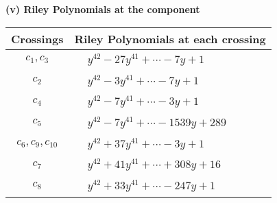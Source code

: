\documentclass[1p]{elsarticle_modified}
\theoremstyle{definition}
\begin{document}
\newpage\renewcommand{\arraystretch}{1}
\flushleft \textbf{(v) Riley Polynomials at the component}\newline \\
\begin{tabular}{m{50pt}|m{274pt}}
Crossings & \hspace{64pt}Riley Polynomials at each crossing \\
\hline $$\begin{aligned}c_{1},c_{3}\end{aligned}$$&$\begin{aligned}
&y^{42}-27 y^{41}+\cdots-7 y+1
\end{aligned}$\\
\hline $$\begin{aligned}c_{2}\end{aligned}$$&$\begin{aligned}
&y^{42}-3 y^{41}+\cdots-7 y+1
\end{aligned}$\\
\hline $$\begin{aligned}c_{4}\end{aligned}$$&$\begin{aligned}
&y^{42}-7 y^{41}+\cdots-3 y+1
\end{aligned}$\\
\hline $$\begin{aligned}c_{5}\end{aligned}$$&$\begin{aligned}
&y^{42}-7 y^{41}+\cdots-1539 y+289
\end{aligned}$\\
\hline $$\begin{aligned}c_{6},c_{9},c_{10}\end{aligned}$$&$\begin{aligned}
&y^{42}+37 y^{41}+\cdots-3 y+1
\end{aligned}$\\
\hline $$\begin{aligned}c_{7}\end{aligned}$$&$\begin{aligned}
&y^{42}+41 y^{41}+\cdots+308 y+16
\end{aligned}$\\
\hline $$\begin{aligned}c_{8}\end{aligned}$$&$\begin{aligned}
&y^{42}+33 y^{41}+\cdots-247 y+1
\end{aligned}$\\
\hline
\end{tabular}\\~\\
\end{document}
